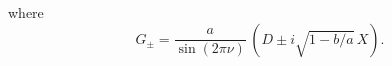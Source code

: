 \documentclass[11pt]{article}
\newcommand{\lt}{\left}
\newcommand{\rt}{\right}
\newcommand*{\bra}[1]{\langle{#1}|}
\newcommand*{\ket}[1]{|{#1}\rangle}
\newcommand{\lar}{{\leftarrow}}
\newcommand{\rar}{{\rightarrow}}
\begin{document}
where
\begin{equation}
G_{\pm}=\frac{a}{\sin(2\pi\nu)}\,\lt(D\pm i\sqrt{1-b/a}\,X\rt).
\end{equation}
\end{document}
